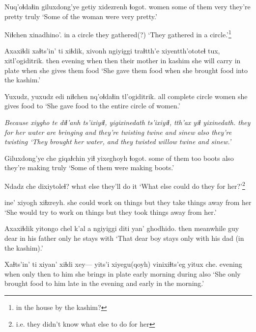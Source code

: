 \documentclass[12pt]{article}
\begin{document}
\gll Nuq'oɬdaɬin giluxdong'ye getiy xidezrenh      ɬogot.
women       {some of them} very  {they're pretty} truly
\glt `Some of the woman were very pretty.'
\glend

\gll Niɬchen     xinadhino'.
{in a circle} {they gathered(?)}
\glt `They gathered in a circle.'\footnote{in the house by the kashim?}
\glend

\gll Axaxiɬdi xaɬts'in' ti xiɬdik, xivonh       ngiyiggi traɬtth'e xiyentth'ototeɬ    tux, xitl'ogiditrik.
then    evening when then  {their mother} in       kashim    {she will carry in plate} when {she gives them food}
\glt `She gave them food when she brought food into the kashim.'
\glend

\gll Yuxudz, yuxudz {edi niɬchen} nq'oɬdaɬin tl'ogiditrik.
all       {}   {complete circle} women       {she gives food to}
\glt `She gave food to the entire circle of women.'
\glend

\gll \em Because \em xiygho  te    diɬ'anh ts'ixiyiɬ, yigixinedath     ts'ixiyiɬ, tth'ax yiɬ  yixinedath.
{} {they for her} water {are bringing}  and   {they're twisting twine} and   sinew  also {they're twisting}
\glt `They brought her water, and they twisted willow twine and sinew.'
\glend

\gll Giluxdong'ye che giqaɬchin yiɬ  yixeghoyh      ɬogot.
{some of them} too boots     also {they're making} truly
\glt `Some of them were making boots.'
\glend

\gll Ndadz che  dixiytoleɬ?
what  else {they'll do it}
\glt `What else could do they for her?'\footnote{i.e. they didn't know what else to do for her}
\glend

         ine' {xiyogh xiɬzreyh}.
{she could work on things} but  {they take things away from her}
\glt `She would try to work on things but they took things away from her.'
\glend

\gll Axaxiɬdik yitongo   chel k'al     a ngiyiggi diti      yan' ghodhido.
then      meanwhile guy  dear {} in        {his father} only {he stays with}
\glt `That dear boy stays only with his dad (in the kashim).'
\glend

\gll Xaɬts'in' ti xiyan' xiɬdi xey--- yits'i xiyegu(qoyh)        vinixiɬts'eg   yitux che.
evening when   only     then {} {to him} {she brings in plate} {early morning} during also                                                     
\glt `She only brought food to him late in the evening and early in the morning.' 
\glend

\end{document}
